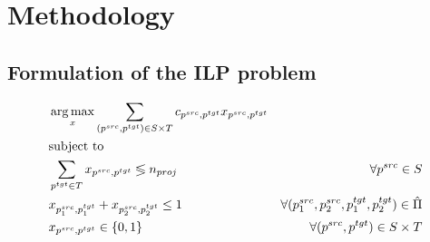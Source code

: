 \chapter{Methodology}
\label{sec:methodology}

\section{Formulation of the ILP problem}

\begin{definition}

\end{definition}
\begin{definition}

\end{definition}

\begin{align}
     & \operatorname*{arg\,max}\limits_x \sum\limits_{(p^{src}, p^{tgt}) \in S \times T} c_{p^{src}, p^{tgt}} x_{p^{src}, p^{tgt}}                                                                      \\
     & \text{subject to} \notag                                                                                                                                                        \\
     & \sum\limits_{p^{tgt} \in T} x_{p^{src}, p^{tgt}} \lessgtr n_{proj}                                         & \forall p^{src} \in S                                              \\
     & x_{p_1^{src}, p_1^{tgt}} + x_{p_2^{src}, p_2^{tgt}} \leq 1                                                 & \forall (p_1^{src}, p_2^{src}, p_1^{tgt}, p_2^{tgt}) \in \hat{\Pi} \\
     & x_{p^{src}, p^{tgt}} \in \{ 0, 1 \}                                                                        & \forall (p^{src}, p^{tgt}) \in S \times T
\end{align}

